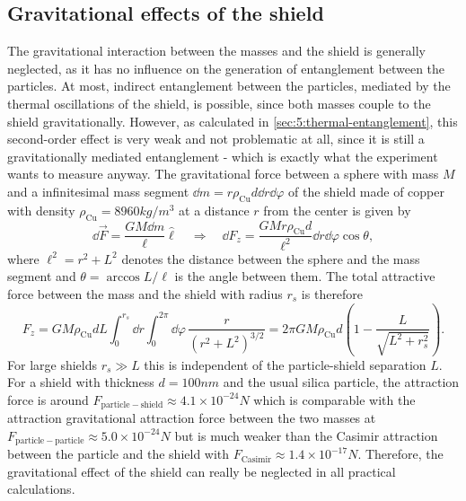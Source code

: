 \subsection{Gravitational effects of the shield}
The gravitational interaction between the masses and the shield is generally neglected, as it has no influence on the generation of entanglement between the particles.
At most, indirect entanglement between the particles, mediated by the thermal oscillations of the shield, is possible, since both masses couple to the shield gravitationally.
However, as calculated in \cref{sec:5:thermal-entanglement}, this second-order effect is very weak and not problematic at all, since it is still a gravitationally mediated entanglement - which is exactly what the experiment wants to measure anyway.
The gravitational force between a sphere with mass $M$ and a infinitesimal mass segment $\dd m = r \rho_\mathrm{Cu} d \dd r \dd \varphi$ of the shield made of copper with density $\rho_\mathrm{Cu} = 8960\si{kg/m^3}$ at a distance $r$ from the center is given by
\begin{equation}
  \dd \vec{F} = \frac{G M \dd m}{\ell} \boldsymbol{\hat{\ell}} 
  \quad \Rightarrow \quad
  \dd F_z = \frac{G M r \rho_\mathrm{Cu} d}{\ell^2} \dd r \dd \varphi \cos \theta,
\end{equation}
where $\ell^2 = r^2 + L^2$ denotes the distance between the sphere and the mass segment and $\theta = \arccos L/\ell$ is the angle between them.
The total attractive force between the mass and the shield with radius $r_s$ is therefore
\begin{equation}
  F_z = GM \rho_\mathrm{Cu} d L \int_{0}^{r_s} \dd r \int_{0}^{2\pi} \dd \varphi \, \frac{r}{(r^2 + L^2)^{3/2}} = 2\pi G M \rho_\mathrm{Cu} d \left(1 - \frac{L}{\sqrt{L^2 + r_s^2}}\right) .
\end{equation}
For large shields $r_s \gg L$ this is independent of the particle-shield separation $L$.
For a shield with thickness $d = 100\si{nm}$ and the usual silica particle, the attraction force is around $F_\mathrm{particle-shield} \approx 4.1\times 10^{-24} \si{N}$ which is comparable with the attraction gravitational attraction force between the two masses at $F_\mathrm{particle-particle} \approx 5.0 \times 10^{-24}\si{N}$ but is much weaker than the Casimir attraction between the particle and the shield with $F_\mathrm{Casimir} \approx 1.4 \times 10^{-17} \si{N}$.
Therefore, the gravitational effect of the shield can really be neglected in all practical calculations.